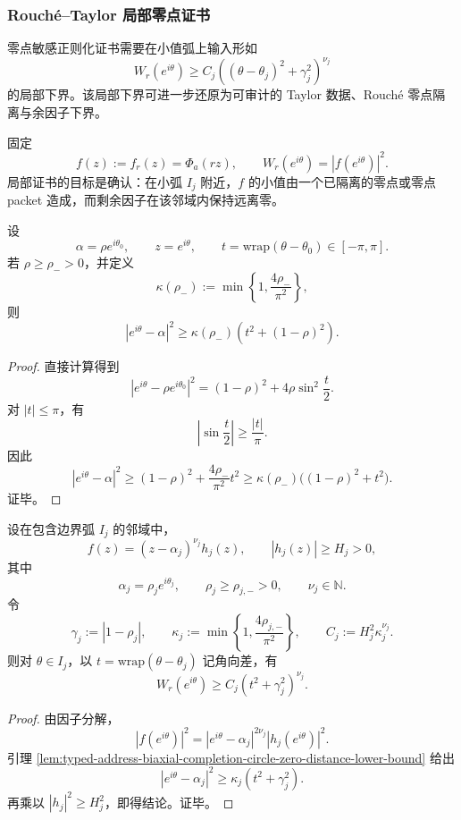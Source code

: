 \subsubsection{Rouch\'e--Taylor 局部零点证书}\label{subsubsec:typed-address-biaxial-completion-rouche-taylor-local-zero-certificate}
零点敏感正则化证书需要在小值弧上输入形如
\[
W_r(e^{i\theta})
\ge
C_j\left((\theta-\theta_j)^2+\gamma_j^2\right)^{\nu_j}
\]
的局部下界。该局部下界可进一步还原为可审计的 Taylor 数据、Rouch\'e 零点隔离与余因子下界。

固定
\[
f(z):=f_r(z)=\Phi_a(rz),
\qquad
W_r(e^{i\theta})=|f(e^{i\theta})|^2.
\]
局部证书的目标是确认：在小弧 \(I_j\) 附近，\(f\) 的小值由一个已隔离的零点或零点 packet 造成，而剩余因子在该邻域内保持远离零。

\begin{lemma}[圆周点到局部零点的几何下界]\label{lem:typed-address-biaxial-completion-circle-zero-distance-lower-bound}
设
\[
\alpha=\rho e^{i\theta_0},
\qquad
z=e^{i\theta},
\qquad
t=\mathrm{wrap}(\theta-\theta_0)\in[-\pi,\pi].
\]
若 \(\rho\ge\rho_->0\)，并定义
\[
\kappa(\rho_-):=
\min\left\{1,\frac{4\rho_-}{\pi^2}\right\},
\]
则
\[
|e^{i\theta}-\alpha|^2
\ge
\kappa(\rho_-)
\left(t^2+(1-\rho)^2\right).
\]
\end{lemma}
\begin{proof}
直接计算得到
\[
|e^{i\theta}-\rho e^{i\theta_0}|^2
=
(1-\rho)^2+4\rho\sin^2\frac t2.
\]
对 \(|t|\le\pi\)，有
\[
\left|\sin\frac t2\right|\ge\frac{|t|}{\pi}.
\]
因此
\[
|e^{i\theta}-\alpha|^2
\ge
(1-\rho)^2+\frac{4\rho_-}{\pi^2}t^2
\ge
\kappa(\rho_-)\bigl((1-\rho)^2+t^2\bigr).
\]
证毕。
\end{proof}

\begin{proposition}[局部因子分解给出小值下界]\label{prop:typed-address-biaxial-completion-local-factor-lower-bound}
设在包含边界弧 \(I_j\) 的邻域中，
\[
f(z)=(z-\alpha_j)^{\nu_j}h_j(z),
\qquad
|h_j(z)|\ge H_j>0,
\]
其中
\[
\alpha_j=\rho_j e^{i\theta_j},
\qquad
\rho_j\ge\rho_{j,-}>0,
\qquad
\nu_j\in\mathbb{N}.
\]
令
\[
\gamma_j:=|1-\rho_j|,
\qquad
\kappa_j:=\min\left\{1,\frac{4\rho_{j,-}}{\pi^2}\right\},
\qquad
C_j:=H_j^2\kappa_j^{\nu_j}.
\]
则对 \(\theta\in I_j\)，以 \(t=\mathrm{wrap}(\theta-\theta_j)\) 记角向差，有
\[
W_r(e^{i\theta})
\ge
C_j(t^2+\gamma_j^2)^{\nu_j}.
\]
\end{proposition}
\begin{proof}
由因子分解，
\[
|f(e^{i\theta})|^2
=
|e^{i\theta}-\alpha_j|^{2\nu_j}|h_j(e^{i\theta})|^2.
\]
引理 \ref{lem:typed-address-biaxial-completion-circle-zero-distance-lower-bound} 给出
\[
|e^{i\theta}-\alpha_j|^2
\ge
\kappa_j(t^2+\gamma_j^2).
\]
再乘以 \(|h_j|^2\ge H_j^2\)，即得结论。证毕。
\end{proof}

